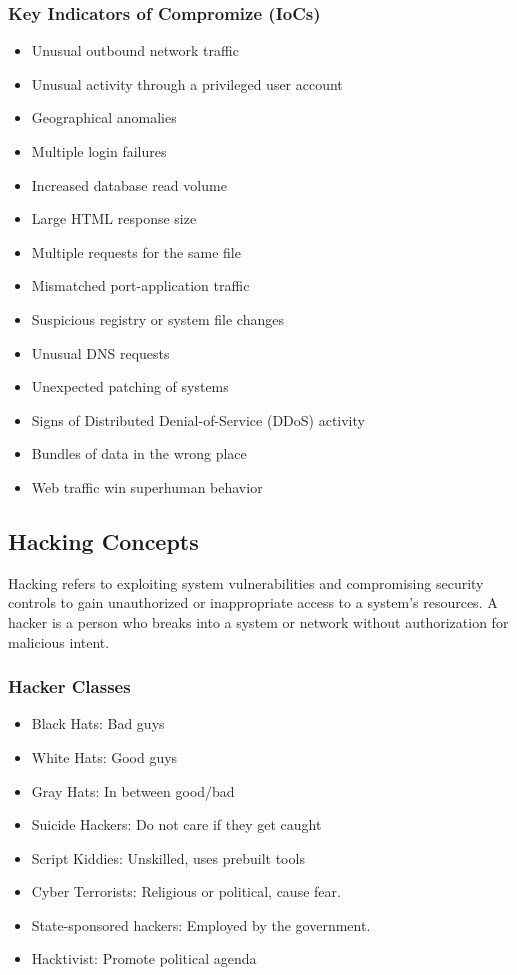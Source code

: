 \subsubsection{Key Indicators of Compromize (IoCs)}
\begin{itemize}
    \item Unusual outbound network traffic
    \item Unusual activity through a privileged user account
    \item Geographical anomalies
    \item Multiple login failures
    \item Increased database read volume 
    \item Large HTML response size
    \item Multiple requests for the same file
    \item Mismatched port-application traffic
    \item Suspicious registry or system file changes
    \item Unusual DNS requests
    \item Unexpected patching of systems
    \item Signs of Distributed Denial-of-Service (DDoS) activity
    \item Bundles of data in the wrong place
    \item Web traffic win superhuman behavior
\end{itemize}

\subsection{Hacking Concepts}
Hacking refers to exploiting system vulnerabilities and compromising security controls to gain unauthorized or inappropriate access to a system's resources.
A hacker is a person who breaks into a system or network without authorization for malicious intent.

\subsubsection{Hacker Classes}
\begin{itemize}
    \item Black Hats: Bad guys
    \item White Hats: Good guys
    \item Gray Hats: In between good/bad
    \item Suicide Hackers: Do not care if they get caught
    \item Script Kiddies: Unskilled, uses prebuilt tools
    \item Cyber Terrorists: Religious or political, cause fear.
    \item State-sponsored hackers: Employed by the government.
    \item Hacktivist: Promote political agenda
\end{itemize}

